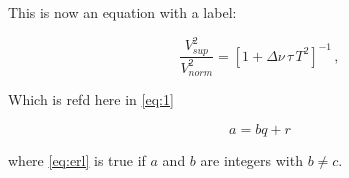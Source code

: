This is now an equation with a label:

\begin{equation}
\label{eq:1}
\frac{V_{ sup}^2}{V_{ norm}^2} = [1 + \Delta \nu \, \tau \, T^2 ]^{-1} \, ,
\end{equation}

Which is refd here in \ref{eq:1}

\begin{equation} \label{eq:erl}
a = bq + r
\end{equation}

where \eqref{eq:erl} is true if $a$ and $b$ are integers with $b \neq c$.
